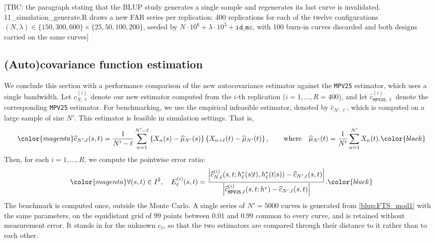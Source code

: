 \color{magenta}
[TBC: the paragraph stating that the BLUP study generates a single sample and regenerates its last curve is invalidated. 11\_simulation\_generate.R draws a new FAR series per replication: 400 replications for each of the twelve configurations $(N,\lambda) \in \{150,300,600\}\times\{25,50,100,200\}$, seeded by $N\cdot 10^6 + \lambda\cdot 10^3 + \texttt{id\_mc}$, with 100 burn-in curves discarded and both designs carried on the same curves]
\color{black}

\subsection{\color{magenta}(Auto)covariance function estimation\color{black}}\label{sec:emp_study:autocov}

\color{magenta}
We conclude this section with a performance comparison of the new autocovariance estimator against the \texttt{MPV25} estimator, which uses a single bandwidth. Let $\widehat{c}_{N,\ell}^{(i)}$ denote our new estimator computed from the $i$-th replication ($i = 1, \ldots, R = 400$), and let $\widehat{c}_{\texttt{MPV25}, \ell}^{(i)}$ denote the corresponding \texttt{MPV25} estimator. For benchmarking, we use the empirical infeasible estimator, denoted by ${\widehat{c}}_{N', \ell}$, which is computed on a large sample of size $N'$. This estimator is feasible in simulation settings. That is,
\color{black}
\begin{equation}
	\color{magenta}\widehat{c}_{N', \ell}(s, t) = \frac{1}{N' - \ell} \sum_{n=1}^{N' - \ell} \left\{X_{n}(s) - \widehat{\mu}_{N'}(s)\right\} \left\{X_{n+\ell}(t) - \widehat{\mu}_{N'}(t)\right\},
	\qquad \text{where} \quad
	\widehat{\mu}_{N'}(t) = \frac{1}{N'} \sum_{n=1}^{N'} X_n(t).\color{black}
\end{equation}
\color{magenta}
Then, for each $i = 1, \ldots, R$, we compute the pointwise error ratio:
\color{black}
\begin{equation}\label{eq:error_ratio_autocov}
	\color{magenta}\forall (s, t) \in I^2, \quad
	E_\ell^{(i)}(s, t) = \frac{\left| \widehat{c}_{N,\ell}^{(i)}(s, t; h_\ell^*(s|t), h_\ell^*(t|s)) - \widehat{c}_{N',\ell}(s, t) \right|}{\left| \widehat{c}_{\texttt{MPV25}, \ell}^{(i)}(s, t; h^*) - \widehat{c}_{N',\ell}(s, t) \right|}.\color{black}
\end{equation}
\color{magenta}
The benchmark is computed once, outside the Monte Carlo. A single series of $N' = 5000$ curves is generated from \eqref{blup:FTS_mod1} with the same parameters, on the equidistant grid of $99$ points between $0.01$ and $0.99$ common to every curve, and is retained without measurement error. It stands in for the unknown $c_\ell$, so that the two estimators are compared through their distance to it rather than to each other.
\color{black}

